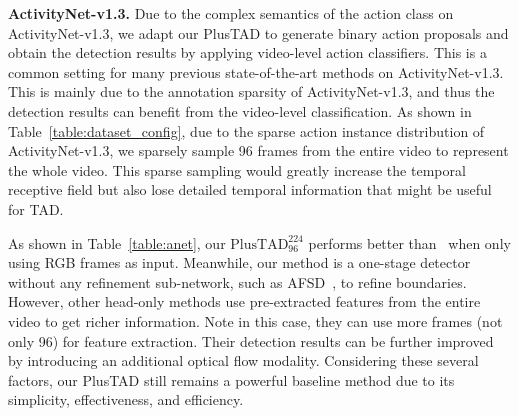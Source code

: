 \documentclass[a4paper,fleqn]{cas-dc}
\begin{document}
\textbf{ActivityNet-v1.3.}
Due to the complex semantics of the action class on ActivityNet-v1.3, we adapt our PlusTAD to generate binary action proposals and obtain the detection results by applying video-level action classifiers. This is a common setting for many previous state-of-the-art methods on ActivityNet-v1.3.
This is mainly due to the annotation sparsity of ActivityNet-v1.3, and thus the detection results can benefit from the video-level classification.
As shown in Table~\ref{table:dataset_config}, due to the sparse action instance distribution of ActivityNet-v1.3, we sparsely sample 96 frames from the entire video to represent the whole video. This sparse sampling would greatly increase the temporal receptive field but also lose detailed temporal information that might be useful for TAD.


As shown in Table~\ref{table:anet}, our $\text{PlusTAD}_{96}^{224}$ performs better than~\citep{bmn,g-tad,afsd} when only using RGB frames as input.
Meanwhile, our method is a one-stage detector without any refinement sub-network, such as AFSD~\citep{afsd}, to refine boundaries. 
However, other head-only methods use pre-extracted features from the entire video to get richer information. Note in this case, they can use more frames (not only 96) for feature extraction.
Their detection results can be further improved by introducing an additional optical flow modality.
Considering these several factors, our PlusTAD still remains a powerful baseline method due to its simplicity, effectiveness, and efficiency.
\end{document}
